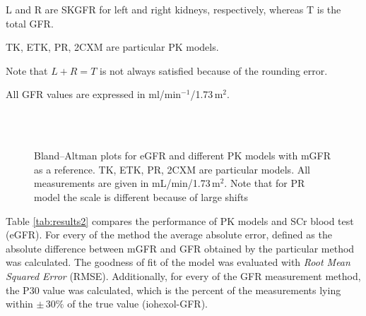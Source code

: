 \begin{landscape}
\begin{table}[H]
\begin{threeparttable}
\begin{tabular}
  \bottomrule

\end{tabular}
\begin{tablenotes}%
\footnotesize{}%
\item L and R are SKGFR for left and right kidneys, respectively, whereas T is the total GFR.
\item TK, ETK, PR, 2CXM are particular PK models. 
\item Note that $L+R = T$ is not always satisfied because of the rounding error.
\item All GFR values are expressed in ml/min$^{-1}$/1.73\,m$^2$.
    \end{tablenotes}
	\end{threeparttable}
\end{table}
\end{landscape}


\begin{figure}[H]
	\centering
	 \\ \vspace{10pt}  
 	 \hfill {} \\ \vspace{10pt}   
	 \hfill {}
\caption[Bland–Altman plots for different methods]{Bland–Altman plots for eGFR and different PK models with mGFR as a reference. TK, ETK, PR, 2CXM are particular models. All measurements are given in mL/min/1.73\,m$^2$. Note that for PR model the scale is different because of large shifts} 
\label{fig:baltman}
\end{figure}

Table \ref{tab:results2} compares the performance of PK models and SCr blood test (eGFR). For every of the method the average absolute error, defined as the absolute difference between mGFR and GFR obtained by the particular method was calculated.
The goodness of fit of the model was evaluated with \textit{Root Mean Squared Error} (RMSE). 
Additionally, for every of the GFR measurement method, the P30 value was calculated, which is the percent of the measurements lying within $\pm\,30\%$ of the true value (iohexol-GFR).


